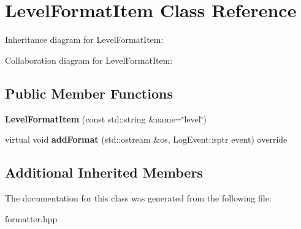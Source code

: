 \hypertarget{classLevelFormatItem}{}\section{Level\+Format\+Item Class Reference}
\label{classLevelFormatItem}


Inheritance diagram for Level\+Format\+Item\+:


Collaboration diagram for Level\+Format\+Item\+:
\subsection*{Public Member Functions}
\begin{DoxyCompactItemize}
\item 
\mbox{\label{classLevelFormatItem_ac6ff3a6cc9edcf61ebae4393716c2f8c}} 
{\bfseries Level\+Format\+Item} (const std\+::string \&name=\char`\"{}level\char`\"{})
\item 
\mbox{\label{classLevelFormatItem_ab96c6cca003c1e0aa856199b0bc6354a}} 
virtual void {\bfseries add\+Format} (std\+::ostream \&os, Log\+Event\+::sptr event) override
\end{DoxyCompactItemize}
\subsection*{Additional Inherited Members}


The documentation for this class was generated from the following file\+:\begin{DoxyCompactItemize}
\item 
formatter.\+hpp\end{DoxyCompactItemize}
